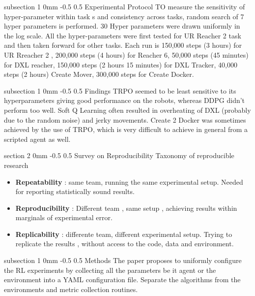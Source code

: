 \documentclass[twocolumn,11pt]{article}
\makeatletter
\renewcommand{\section}{\@startsection
{section}%
{2}%
{0mm}%
{-0.5\baselineskip}%
{0.5\baselineskip}%
{\bfseries\color{blue}}} %
\renewcommand{\subsection}{\@startsection
{subsection}%
{1}%
{0mm}%
{-0.5\baselineskip}%
{0.5\baselineskip}%
{\bfseries\color{blue}}} %
\makeatother
\begin{document}
\subsection{Experimental Protocol}
TO measure the  sensitivity  of hyper-parameter within task s and  consistency across tasks, random search of 7 hyper parameters is  performed. 30 Hyper parameters were drawn uniformly in the log scale. All the hyper-parameters were first tested for  UR Reacher 2 task and then  taken forward for other tasks.
Each run is 150,000 steps (3 hours)  for  UR Rreacher 2 , 200,000 steps (4 hours)  for Reacher 6, 50,000  steps  (45 minutes) for DXL reacher, 150,000 steps (2 hours 15 minutes)  for DXL  Tracker, 40,000 steps (2  hours) Create Mover,  300,000  steps for Create Docker.

\subsection{Findings}
TRPO seemed to be least  sensitive to its hyperparameters giving good performance on the robots, whereas DDPG didn't perform  too well. Soft Q Learning often resulted in overheating of  DXL (probably due  to the random noise) and jerky movements. Create 2 Docker was  sometimes achieved by  the use  of  TRPO,  which is very difficult to achieve in general from a scripted agent as well. 

\section{Survey  on  Reproducibility}
Taxonomy of reproducible research 
\begin{itemize}
\item \textbf{Repeatability } : same team, running the same experimental setup.  Needed for reporting statistically sound results. 
\item \textbf{Reproducibility} : Different team , same setup , achieving results within marginals of  experimental error. 
\item \textbf{Replicability} : differente  team, different experimental  setup. Trying to replicate the results  , without access to the code, data and  environment.

\end{itemize}
\subsection{Methods}
The paper  proposes to uniformly configure the RL  experiments by collecting  all the parameters be it agent or the environment into a YAML configuration file. Separate the  algorithms from the environments and  metric collection routines.  
\end{document}
